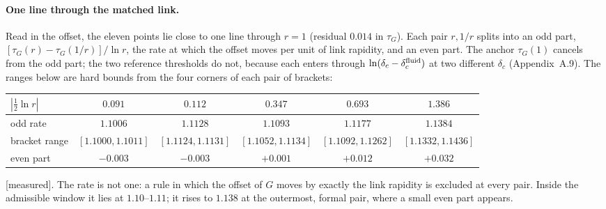 \documentclass[11pt]{article}
\newcommand{\grade}[1]{\textsf{\small[#1]}}
\begin{document}
\paragraph{One line through the matched link.} Read in the offset, the eleven points lie close to one line through $r=1$ (residual $0.014$ in $\tau_G$). Each pair $r,1/r$ splits into an odd part, $[\tau_G(r)-\tau_G(1/r)]/\ln r$, the rate at which the offset moves per unit of link rapidity, and an even part. The anchor $\tau_G(1)$ cancels from the odd part; the two reference thresholds do not, because each enters through $\ln(\delta_c-\delta_c^{\rm fluid})$ at two different $\delta_c$ (Appendix~A.9). The ranges below are hard bounds from the four corners of each pair of brackets:
\begin{center}\small\begin{tabular}{lccccc}\toprule
$|\tfrac12\ln r|$ & $0.091$ & $0.112$ & $0.347$ & $0.693$ & $1.386$\\\midrule
odd rate & $1.1006$ & $1.1128$ & $1.1093$ & $1.1177$ & $1.1384$\\
bracket range & $[1.1000,1.1011]$ & $[1.1124,1.1131]$ & $[1.1052,1.1134]$ & $[1.1092,1.1262]$ & $[1.1332,1.1436]$\\
even part & $-0.003$ & $-0.003$ & $+0.001$ & $+0.012$ & $+0.032$\\\bottomrule\end{tabular}\end{center}
\grade{measured}. The rate is not one: a rule in which the offset of $G$ moves by exactly the link rapidity is excluded at every pair. Inside the admissible window it lies at $1.10$--$1.11$; it rises to $1.138$ at the outermost, formal pair, where a small even part appears.
\end{document}
